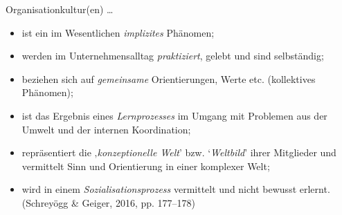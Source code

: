 \documentclass[
  letterpaper,
]{book}
\begin{document}
Organisationkultur(en) \ldots{}

\begin{itemize}
\item
  ist ein im Wesentlichen \emph{implizites} Phänomen;
\item
  werden im Unternehmensalltag \emph{praktiziert}, gelebt und sind
  selbständig;
\item
  beziehen sich auf \emph{gemeinsame} Orientierungen, Werte etc.
  (kollektives Phänomen);
\item
  ist das Ergebnis eines \emph{Lernprozesses} im Umgang mit Problemen
  aus der Umwelt und der internen Koordination;
\item
  repräsentiert die ‚\emph{konzeptionelle Welt}' bzw. `\emph{Weltbild}'
  ihrer Mitglieder und vermittelt Sinn und Orientierung in einer
  komplexer Welt;
\item
  wird in einem \emph{Sozialisationsprozess} vermittelt und nicht
  bewusst erlernt. (Schreyögg \& Geiger, 2016, pp. 177--178)
\end{itemize}
\end{document}
